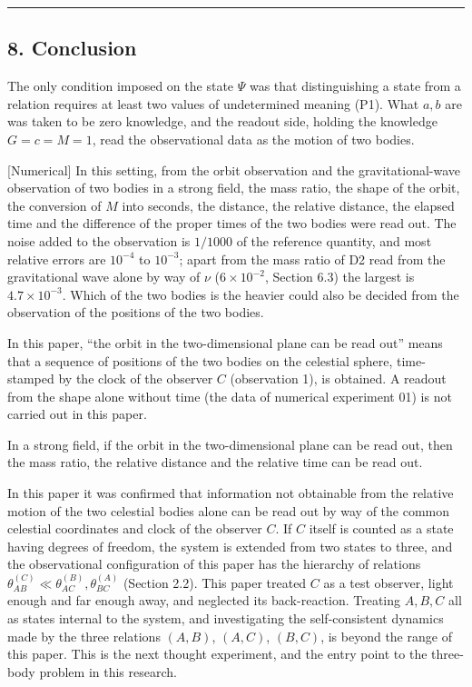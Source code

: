 \documentclass[
  a4paper,
]{article}
\begin{document}
\begin{center}\rule{0.5\linewidth}{0.5pt}\end{center}

\subsection{8. Conclusion}\label{conclusion}

The only condition imposed on the state \(\Psi\) was that distinguishing
a state from a relation requires at least two values of undetermined
meaning (P1). What \(a, b\) are was taken to be zero knowledge, and the
readout side, holding the knowledge \(G=c=M=1\), read the observational
data as the motion of two bodies.

{[}Numerical{]} In this setting, from the orbit observation and the
gravitational-wave observation of two bodies in a strong field, the mass
ratio, the shape of the orbit, the conversion of \(M\) into seconds, the
distance, the relative distance, the elapsed time and the difference of
the proper times of the two bodies were read out. The noise added to the
observation is \(1/1000\) of the reference quantity, and most relative
errors are \(10^{-4}\) to \(10^{-3}\); apart from the mass ratio of D2
read from the gravitational wave alone by way of \(\nu\)
(\(6\times10^{-2}\), Section 6.3) the largest is \(4.7\times10^{-3}\).
Which of the two bodies is the heavier could also be decided from the
observation of the positions of the two bodies.

In this paper, ``the orbit in the two-dimensional plane can be read
out'' means that a sequence of positions of the two bodies on the
celestial sphere, time-stamped by the clock of the observer \(C\)
(observation 1), is obtained. A readout from the shape alone without
time (the data of numerical experiment 01) is not carried out in this
paper.

In a strong field, if the orbit in the two-dimensional plane can be read
out, then the mass ratio, the relative distance and the relative time
can be read out.

In this paper it was confirmed that information not obtainable from the
relative motion of the two celestial bodies alone can be read out by way
of the common celestial coordinates and clock of the observer \(C\). If
\(C\) itself is counted as a state having degrees of freedom, the system
is extended from two states to three, and the observational
configuration of this paper has the hierarchy of relations
\(\theta_{AB}^{(C)}\ll\theta_{AC}^{(B)},\theta_{BC}^{(A)}\) (Section
2.2). This paper treated \(C\) as a test observer, light enough and far
enough away, and neglected its back-reaction. Treating \(A, B, C\) all
as states internal to the system, and investigating the self-consistent
dynamics made by the three relations \((A,B)\), \((A,C)\), \((B,C)\), is
beyond the range of this paper. This is the next thought experiment, and
the entry point to the three-body problem in this research.
\end{document}
